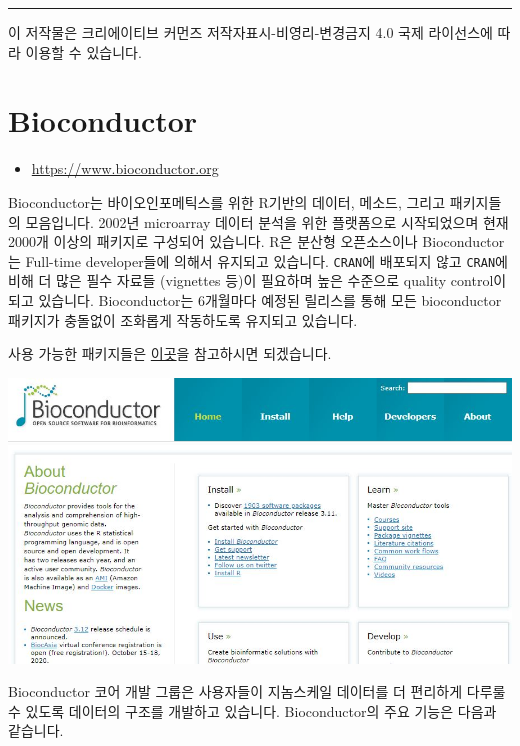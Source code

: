 \documentclass[
]{book}
\providecommand{\tightlist}{%
  \setlength{\itemsep}{0pt}\setlength{\parskip}{0pt}}
\begin{document}
\begin{center}\rule{0.5\linewidth}{0.5pt}\end{center}

이 저작물은 크리에이티브 커먼즈 저작자표시-비영리-변경금지 4.0 국제 라이선스에 따라 이용할 수 있습니다.

\hypertarget{bioconductor}{%
\chapter{Bioconductor}\label{bioconductor}}

\begin{itemize}
\tightlist
\item
  \url{https://www.bioconductor.org}
\end{itemize}

Bioconductor는 바이오인포메틱스를 위한 R기반의 데이터, 메소드, 그리고 패키지들의 모음입니다. 2002년 microarray 데이터 분석을 위한 플랫폼으로 시작되었으며 현재 2000개 이상의 패키지로 구성되어 있습니다. R은 분산형 오픈소스이나 Bioconductor는 Full-time developer들에 의해서 유지되고 있습니다. \texttt{CRAN}에 배포되지 않고 \texttt{CRAN}에 비해 더 많은 필수 자료들 (vignettes 등)이 필요하며 높은 수준으로 quality control이 되고 있습니다. Bioconductor는 6개월마다 예정된 릴리스를 통해 모든 bioconductor 패키지가 충돌없이 조화롭게 작동하도록 유지되고 있습니다.

사용 가능한 패키지들은 \href{http://bioconductor.org/packages/release/BiocViews.html\#___Software}{이곳}을 참고하시면 되겠습니다.

\includegraphics[width=6.25in,height=\textheight]{images/04/bioconductor.JPG}

Bioconductor 코어 개발 그룹은 사용자들이 지놈스케일 데이터를 더 편리하게 다루룰 수 있도록 데이터의 구조를 개발하고 있습니다. Bioconductor의 주요 기능은 다음과 같습니다.
\end{document}
